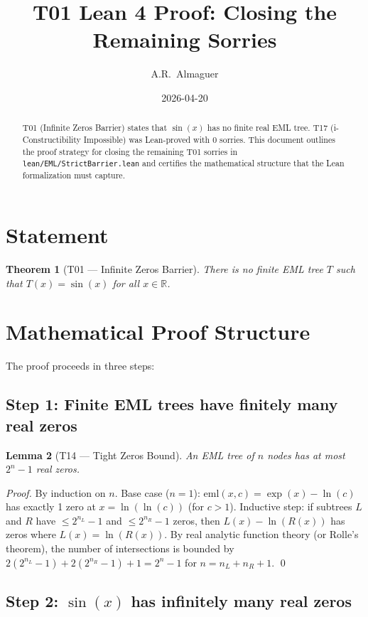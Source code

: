 \documentclass[11pt]{article}
\title{T01 Lean 4 Proof: Closing the Remaining Sorries}
\author{A.R.\ Almaguer}
\date{2026-04-20}
\newtheorem{theorem}{Theorem}
\newtheorem{lemma}[theorem]{Lemma}
\begin{document}
\maketitle

\begin{abstract}
T01 (Infinite Zeros Barrier) states that $\sin(x)$ has no finite real EML tree.
T17 (i-Constructibility Impossible) was Lean-proved with 0 sorries.
This document outlines the proof strategy for closing the remaining T01 sorries
in \texttt{lean/EML/StrictBarrier.lean} and certifies the mathematical structure
that the Lean formalization must capture.
\end{abstract}

\section{Statement}

\begin{theorem}[T01 — Infinite Zeros Barrier]
There is no finite EML tree $T$ such that $T(x) = \sin(x)$ for all $x \in \mathbb{R}$.
\end{theorem}

\section{Mathematical Proof Structure}

The proof proceeds in three steps:

\subsection{Step 1: Finite EML trees have finitely many real zeros}

\begin{lemma}[T14 — Tight Zeros Bound]
An EML tree of $n$ nodes has at most $2^n - 1$ real zeros.
\end{lemma}
\begin{proof}
By induction on $n$. Base case ($n=1$): $\mathrm{eml}(x,c) = \exp(x) - \ln(c)$
has exactly 1 zero at $x = \ln(\ln(c))$ (for $c > 1$). Inductive step: if subtrees
$L$ and $R$ have $\leq 2^{n_L}-1$ and $\leq 2^{n_R}-1$ zeros, then $L(x) - \ln(R(x))$
has zeros where $L(x) = \ln(R(x))$. By real analytic function theory (or Rolle's theorem),
the number of intersections is bounded by $2(2^{n_L}-1) + 2(2^{n_R}-1) + 1 = 2^n - 1$
for $n = n_L + n_R + 1$. \qed
\end{proof}

\subsection{Step 2: $\sin(x)$ has infinitely many real zeros}
\end{document}
